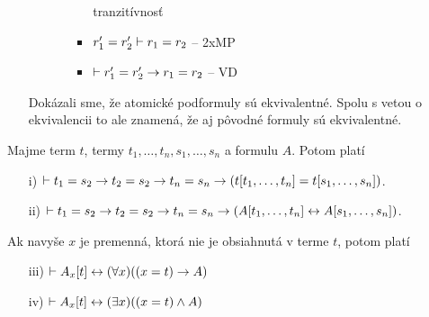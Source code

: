 \begin{dokaz}
\begin{itemize}
\begin{itemize}
\begin{itemize}
\begin{itemize}
                            tranzitívnosť
                \item $r_1'=r_2' \vdash r_1 = r_2$ -- 2xMP
                \item $\vdash r_1'=r_2' \rightarrow r_1=r_2$ -- VD
                \end{itemize}
            \end{itemize}
        \end{itemize}
        Dokázali sme, že atomické podformuly sú ekvivalentné. Spolu s
        vetou o ekvivalencii to ale znamená, že aj pôvodné formuly sú
        ekvivalentné.
\end{itemize}
\end{dokaz}

\begin{veta}
    Majme term $t$, termy $t_1,\dots,t_n, s_1,\dots, s_n$ a formulu
    $A$.
    Potom platí
    \begin{itemize}
        \item[i)] $\vdash t_1=s_2 \rightarrow t_2=s_2 \rightarrow
            t_n=s_n \rightarrow (t[t_1,\dots,t_n] = t[s_1,\dots,s_n])$.
        \item[ii)] $\vdash t_1=s_2 \rightarrow t_2=s_2 \rightarrow
            t_n=s_n \rightarrow (A[t_1,\dots,t_n] \leftrightarrow 
                              A[s_1,\dots,s_n])$.
    \end{itemize}
    Ak navyše $x$ je premenná, ktorá nie je obsiahnutá v terme $t$,
    potom platí
    \begin{itemize}
        \item[iii)] $\vdash A_x[t] \leftrightarrow 
            (\forall x)((x=t) \rightarrow A)$
        \item[iv)] $\vdash A_x[t] \leftrightarrow 
            (\exists x)((x=t) \land A)$
    \end{itemize}
\end{veta}
